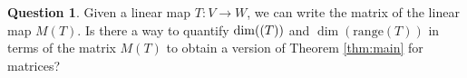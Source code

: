 \documentclass[11pt,reqno]{amsart}
\theoremstyle{definition}
\newtheorem{question}[theorem]{Question}
\newcommand{\range}{\mathrm{range}}
\begin{document}
\begin{question}
Given a linear map $T: V \rightarrow W$, we can write the matrix of the linear map $M(T)$. Is there a way to quantify $\dim(\null(T))$ and $\dim(\range(T))$ in terms of the matrix $M(T)$ to obtain a version of Theorem \ref{thm:main} for matrices? 
\end{question}






\end{document}
